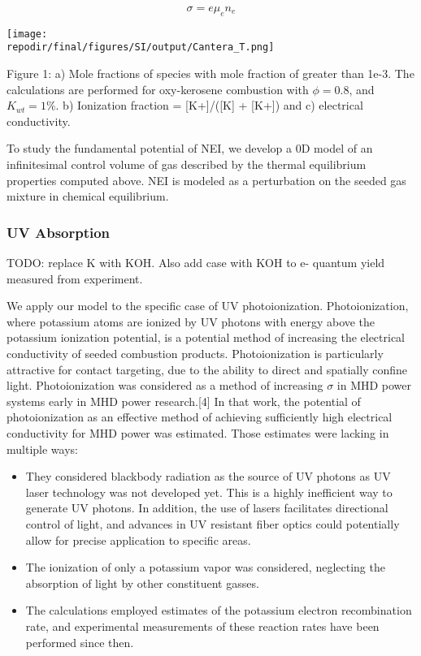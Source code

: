 \begin{equation}
\sigma = e\mu_{e}n_{e}
\end{equation}

\texttt{[image: \\repodir/final/figures/SI/output/Cantera\_T.png]}

Figure 1: a) Mole fractions of species with mole fraction of greater than 1e-3. The calculations are performed for oxy-kerosene combustion with \(\phi = 0.8\), and \(K_{wt} = 1\%\). b) Ionization fraction = {[}K+{]}/({[}K{]} + {[}K+{]}) and c) electrical conductivity.

To study the fundamental potential of NEI, we develop a 0D model of an infinitesimal control volume of gas described by the thermal equilibrium properties computed above. NEI is modeled as a perturbation on the seeded gas mixture in chemical equilibrium. 


\hypertarget{photoionization}{%
\subsubsection{UV Absorption}\label{photoionization}}

TODO: replace K with KOH. Also add case with KOH to e- quantum yield measured from experiment. 

We apply our model to the specific case of UV photoionization. Photoionization, where potassium atoms are ionized by UV photons with energy above the potassium ionization potential, is a potential method of increasing the electrical conductivity of seeded combustion products. Photoionization is particularly attractive for contact targeting, due to the ability to direct and spatially confine light. Photoionization was considered as a method of increasing \(\sigma\) in MHD power systems early in MHD power research.{[}4{]} In that work, the potential of photoionization as an effective method of achieving sufficiently high electrical conductivity for MHD power was estimated. Those estimates were lacking in multiple ways:

\begin{itemize}
\item
  They considered blackbody radiation as the source of UV photons as UV laser technology was not developed yet. This is a highly inefficient way to generate UV photons. In addition, the use of lasers facilitates directional control of light, and advances in UV resistant fiber optics could potentially allow for precise application to specific areas.
\item
  The ionization of only a potassium vapor was considered, neglecting the absorption of light by other constituent gasses.
\item
  The calculations employed estimates of the potassium electron recombination rate, and experimental measurements of these reaction rates have been performed since then.
\end{itemize}

